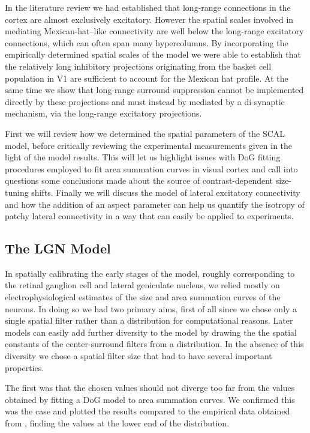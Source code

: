 In the literature review we had established that long-range
connections in the cortex are almost exclusively excitatory. However
the spatial scales involved in mediating Mexican-hat--like connectivity
are well below the long-range excitatory connections, which can often
span many hypercolumns. By incorporating the empirically determined
spatial scales of the model we were able to establish that the
relatively long inhibitory projections originating from the basket cell
population in V1 are sufficient to account for the Mexican hat
profile. At the same time we show that long-range surround suppression
cannot be implemented directly by these projections and must instead by
mediated by a di-synaptic mechanism, via the long-range excitatory
projections.

First we will review how we determined the spatial parameters of the
SCAL model, before critically reviewing the experimental measurements
given in the light of the model results. This will let us highlight
issues with DoG fitting procedures employed to fit area summation
curves in visual cortex and call into questions some conclusions made
about the source of contrast-dependent size-tuning shifts. Finally we
will discuss the model of lateral excitatory connectivity and how the
addition of an aspect parameter can help us quantify the isotropy of
patchy lateral connectivity in a way that can easily be applied to
experiments.

\subsection{The LGN Model}

In spatially calibrating the early stages of the model, roughly
corresponding to the retinal ganglion cell and lateral geniculate
nucleus, we relied mostly on electrophysiological estimates of the
size and area summation curves of the neurons. In doing so we had two
primary aims, first of all since we chose only a single spatial filter
rather than a distribution for computational reasons. Later models can
easily add further diversity to the model by drawing the the spatial
constants of the center-surround filters from a distribution. In the
absence of this diversity we chose a spatial filter size that had to
have several important properties.

The first was that the chosen values should not diverge too far from
the values obtained by fitting a DoG model to area summation
curves. We confirmed this was the case and plotted the results
compared to the empirical data obtained from \cite{Sceniak2006},
finding the values at the lower end of the distribution.

